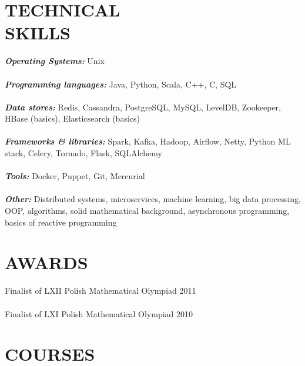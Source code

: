 \documentclass[margin, 10pt]{res} %
\begin{document}
\begin{resume}

\section{TECHNICAL \\ SKILLS} 

{\sl \bf Operating Systems:} Unix \\ \\
{\sl \bf Programming languages:}
Java, Python, Scala, C++, C, SQL \\ \\ 
{\sl \bf Data stores:} Redis, Cassandra, PostgreSQL, MySQL, LevelDB, Zookeeper, HBase (basics), Elasticsearch (basics) \\ \\
{\sl \bf Frameworks \& libraries:} Spark, Kafka, Hadoop, Airflow, Netty, Python ML stack, Celery, Tornado, Flask, SQLAlchemy \\ \\
{\sl \bf Tools:} Docker, Puppet, Git, Mercurial \\ \\
{\sl \bf Other:} Distributed systems, microservices, machine learning, big data processing, OOP, algorithms, solid mathematical background, asynchronous programming, basics of reactive programming


\section{ AWARDS } 

Finalist of LXII Polish Mathematical Olympiad \hfill 2011 \\ \\
Finalist of LXI Polish Mathematical Olympiad \hfill 2010

 
\section{COURSES}


\end{resume}
\end{document}
